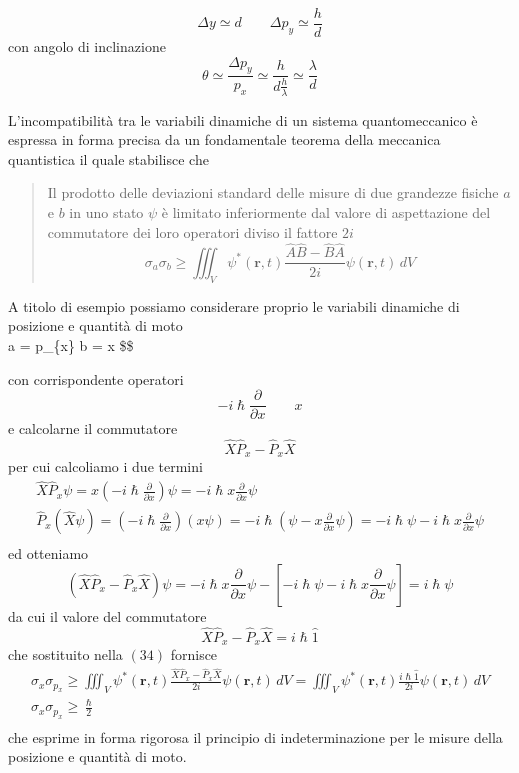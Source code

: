 \[
    \Delta y \simeq d \qquad \Delta p_{y} \simeq \frac{h}{d}
\] con angolo di inclinazione
\[
    \theta \simeq \frac{\Delta p_{y}}{p_{x}} \simeq \frac{h}{d \frac{h}{\lambda}} \simeq \frac{\lambda}{d}
\]

L'incompatibilità tra le variabili dinamiche di un sistema
quantomeccanico è espressa in forma precisa da un fondamentale teorema
della meccanica quantistica il quale stabilisce che

\begin{quote}
    Il prodotto delle deviazioni standard delle misure di due grandezze
    fisiche \(a\) e \(b\) in uno stato \(\psi\) è limitato inferiormente dal
    valore di aspettazione del commutatore dei loro operatori diviso il
    fattore \(2i\)
    \begin{equation}
        \sigma_{a} \sigma_{b} \geq \iiint_{V} \psi^{*}(\bm{r},t) \frac{\hat{A}\hat{B} -\hat{B}\hat{A}}{2i} \psi(\bm{r},t) \, dV
    \end{equation}
\end{quote}

A titolo di esempio possiamo considerare proprio le variabili dinamiche
di posizione e quantità di moto\[
\] a = p\_\{x\} \qquad b = x \$\$

con corrispondente operatori \[
                                 - i \hslash \frac{\partial}{\partial x} \qquad x
\] e calcolarne il commutatore
\[
    \hat{X}\hat{P}_{x} - \hat{P}_{x}\hat{X}
\] per cui calcoliamo i due termini \begin{gather*}
    \hat{X}\hat{P}_{x} \psi = x \left(  - i \hslash \frac{\partial}{\partial x} \right) \psi = - i \hslash x \frac{\partial}{\partial x}\psi\\
    \hat{P}_{x}(\hat{X} \psi) = \left( - i \hslash \frac{\partial}{\partial x} \right)(x \psi)  = - i \hslash \left( \psi - x \frac{\partial}{\partial x} \psi \right) = - i \hslash \psi - i \hslash x \frac{\partial}{\partial x} \psi\\
\end{gather*} ed otteniamo \[
                    (\hat{X}\hat{P}_{x} - \hat{P}_{x}\hat{X}) \psi = - i \hslash x \frac{\partial}{\partial x}\psi - \left[ - i \hslash \psi - i \hslash x \frac{\partial}{\partial x} \psi \right] = i \hslash \psi
\] da cui il valore del commutatore \[
                                        \hat{X}\hat{P}_{x} - \hat{P}_{x}\hat{X} = i \hslash  \hat{1}
\] che sostituito nella \((34)\) fornisce
\begin{gather*}
    \sigma_{x} \sigma_{p_{x}} \geq \iiint_{V} \psi^{*}(\bm{r},t) \frac{\hat{X}\hat{P}_{x} - \hat{P}_{x}\hat{X}}{2 i } \psi(\bm{r},t) \, dV =
    \iiint_{V} \psi^{*}(\bm{r},t) \frac{i \hslash  \hat{1}}{2i}\psi(\bm{r},t) \, dV\\
    \sigma_{x}\sigma_{p_{x}} \geq \frac{\hslash}{2}\\
\end{gather*} che esprime in forma rigorosa il principio di indeterminazione per le
misure della posizione e quantità di moto.

